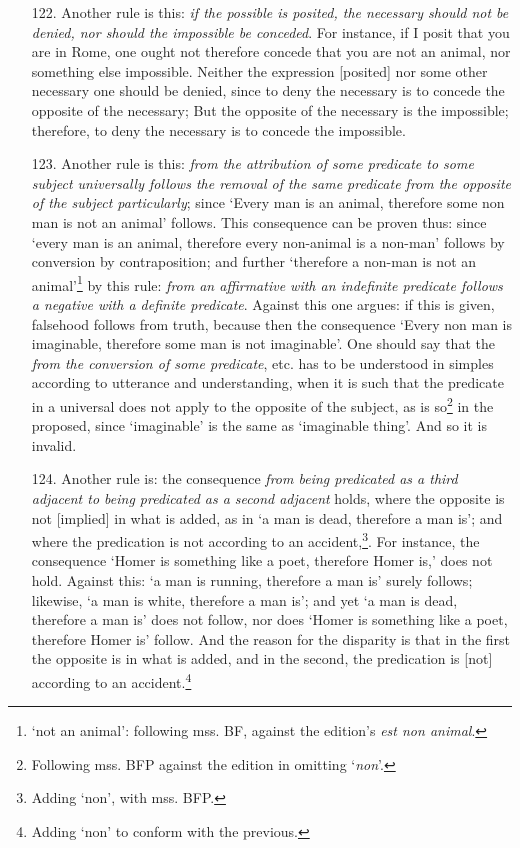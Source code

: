 \documentclass[]{article}
\begin{document}
\begin{itemize}
\item[122.] Another rule is this: \textit{if the possible is posited, the necessary should not be denied, nor should the impossible be conceded}. For instance, if I posit that you are in Rome, one ought not therefore concede that you are not an animal, nor something else impossible. Neither the expression [posited] nor some other necessary one should be denied, since to deny the necessary is to concede the opposite of the necessary; But the opposite of the necessary is the impossible; therefore, to deny the necessary is to concede the impossible.
\item[123.] Another rule is this: \textit{from the attribution of some predicate to some subject universally follows the removal of the same predicate from the opposite of the subject particularly}; since `Every man is an animal, therefore some non man is not an animal' follows. This consequence can be proven thus: since `every man is an animal, therefore every non-animal is a non-man' follows by conversion by contraposition; and further `therefore a non-man is not an animal'\footnote{`not an animal': following mss. BF, against the edition's \textit{est non animal}.} by this rule: \textit{from an affirmative with an indefinite predicate follows a negative with a definite predicate}. Against this one argues: if this is given, falsehood follows from truth, because then the consequence `Every non man is imaginable, therefore some man is not imaginable'. One should say that the \textit{from the conversion of some predicate}, etc. has to be understood in simples according to utterance and understanding, when it is such that the predicate in a universal does not apply to the opposite of the subject, as is so\footnote{Following mss. BFP against the edition in omitting `\textit{non}'.} in the proposed, since `imaginable' is the same as `imaginable thing'. And so it is invalid.
\item[124.] Another rule is: the consequence \textit{from being predicated as a third adjacent to being predicated as a second adjacent} holds, where the opposite is not [implied] in what is added, as in `a man is dead, therefore a man is'; and where the predication is not according to an accident,\footnote{Adding `non', with mss. BFP.}. For instance, the consequence `Homer is something like a poet, therefore Homer is,' does not hold. Against this: `a man is running, therefore a man is' surely follows; likewise, `a man is white, therefore a man is'; and yet `a man is dead, therefore a man is' does not follow, nor does `Homer is something like a poet, therefore Homer is' follow. And the reason for the disparity is that in the first the opposite is in what is added, and in the second, the predication is [not] according to an accident.\footnote{Adding `non' to conform with the previous.}

\end{itemize}
\end{document}
